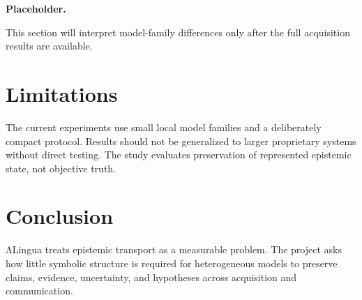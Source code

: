 \documentclass[11pt]{article}
\begin{document}
\textbf{Placeholder.}

This section will interpret model-family differences only after the full acquisition results are available.

\section{Limitations}

The current experiments use small local model families and a deliberately compact protocol. Results should not be generalized to larger proprietary systems without direct testing. The study evaluates preservation of represented epistemic state, not objective truth.

\section{Conclusion}

ΛLingua treats epistemic transport as a measurable problem. The project asks how little symbolic structure is required for heterogeneous models to preserve claims, evidence, uncertainty, and hypotheses across acquisition and communication.



\end{document}
